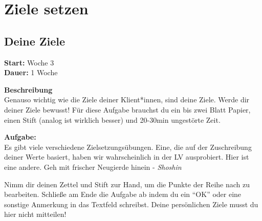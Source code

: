 \documentclass[
  letterpaper,
  DIV=11,
  numbers=noendperiod]{scrreprt}
\begin{document}
\section{Ziele setzen}\label{ziele-setzen-1}

\subsection{Deine Ziele}\label{deine-ziele}

\textbf{Start:} Woche 3\\
\textbf{Dauer:} 1 Woche

\textbf{Beschreibung}\\
Genauso wichtig wie die Ziele deiner Klient*innen, sind deine Ziele.
Werde dir deiner Ziele bewusst! Für diese Aufgabe brauchst du ein bis
zwei Blatt Papier, einen Stift (analog ist wirklich besser) und 20-30min
ungestörte Zeit.

\textbf{Aufgabe:}\\
Es gibt viele verschiedene Zielsetzungsübungen. Eine, die auf der
Zuschreibung deiner Werte basiert, haben wir wahrscheinlich in der LV
ausprobiert. Hier ist eine andere. Geh mit frischer Neugierde hinein -
\emph{Shoshin}

Nimm dir deinen Zettel und Stift zur Hand, um die Punkte der Reihe nach
zu bearbeiten. Schließe am Ende die Aufgabe ab indem du ein ``OK'' oder
eine sonstige Anmerkung in das Textfeld schreibst. Deine persönlichen
Ziele musst du hier nicht mitteilen!
\end{document}
